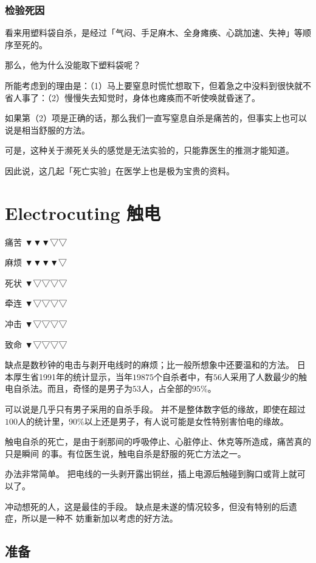 \documentclass[UTF8]{ctexart}
\begin{document}
\subsubsection*{检验死因}

看来用塑料袋自杀，是经过「气闷、手足麻木、全身瘫痪、心跳加速、失神」等顺序至死的。

那么，他为什么没能取下塑料袋呢？

所能考虑到的理由是：（1）马上要窒息时慌忙想取下，但着急之中没料到很快就不省人事了：（2）慢慢失去知觉时，身体也瘫痪而不听使唤就昏迷了。

如果第（2）项是正确的话，那么我们一直写窒息自杀是痛苦的，但事实上也可以说是相当舒服的方法。

可是，这种关于濒死关头的感觉是无法实验的，只能靠医生的推测才能知道。 

因此说，这几起「死亡实验」在医学上也是极为宝贵的资料。

\newpage

\section{Electrocuting 触电}

痛苦 ▼▼▼▽▽

麻烦 ▼▼▼▼▽

死状 ▼▽▽▽▽

牵连 ▼▽▽▽▽

冲击 ▼▽▽▽▽

致命 ▼▽▽▽▽

缺点是数秒钟的电击与剥开电线时的麻烦；比一般所想象中还要温和的方法。
日本厚生省1991年的统计显示，当年$19875$个自杀者中，有$56$人采用了人数最少的触电自杀法。而且，奇怪的是男子为$53$人，占全部的$95\%$。

可以说是几乎只有男子采用的自杀手段。
并不是整体数字低的缘故，即使在超过$100$人的统计里，$90\%$以上还是男子，有人说可能是女性特别害怕电的缘故。

触电自杀的死亡，是由于剎那间的呼吸停止、心脏停止、休克等所造成，痛苦真的只是瞬间 的事。有位医生说，触电自杀是舒服的死亡方法之一。

办法非常简单。
把电线的一头剥开露出铜丝，插上电源后触碰到胸口或背上就可以了。

冲动想死的人，这是最佳的手段。
缺点是未遂的情况较多，但没有特别的后遗症，所以是一种不 妨重新加以考虑的好方法。

\subsection{准备}
\end{document}
